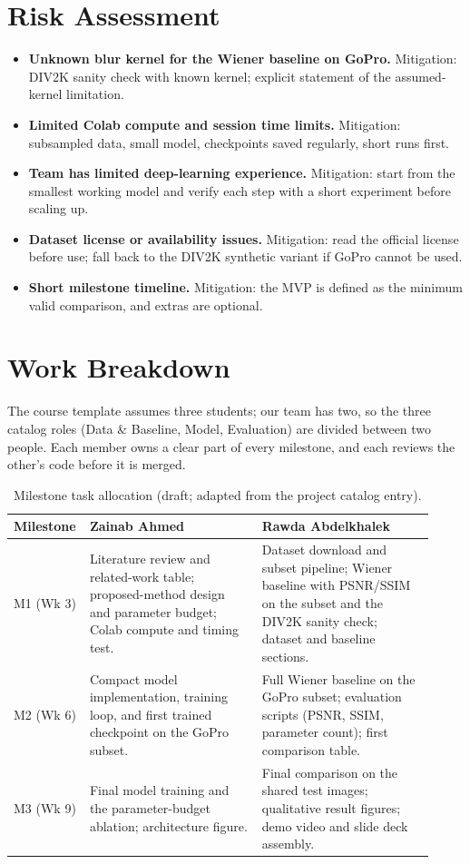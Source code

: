 \documentclass[11pt]{article}
\begin{document}
\section{Risk Assessment}
\label{sec:risk}
\begin{itemize}[leftmargin=*]
  \item \textbf{Unknown blur kernel for the Wiener baseline on GoPro.} Mitigation: DIV2K
        sanity check with known kernel; explicit statement of the assumed-kernel limitation.
  \item \textbf{Limited Colab compute and session time limits.} Mitigation: subsampled data,
        small model, checkpoints saved regularly, short runs first.
  \item \textbf{Team has limited deep-learning experience.} Mitigation: start from the smallest
        working model and verify each step with a short experiment before scaling up.
  \item \textbf{Dataset license or availability issues.} Mitigation: read the official license
        before use; fall back to the DIV2K synthetic variant if GoPro cannot be used.
  \item \textbf{Short milestone timeline.} Mitigation: the MVP is defined as the minimum
        valid comparison, and extras are optional.
\end{itemize}

\section{Work Breakdown}
\label{sec:workbreakdown}
The course template assumes three students; our team has two, so the three catalog roles
(Data \& Baseline, Model, Evaluation) are divided between two people.
Each member owns a clear part of every milestone, and each reviews the other's code before it is merged.

\begin{table}[h]
\centering
\caption{Milestone task allocation (draft; adapted from the project catalog entry).}
\label{tab:tasks}
\begin{tabular}{@{}p{0.12\linewidth}p{0.40\linewidth}p{0.40\linewidth}@{}}
\toprule
\textbf{Milestone} & \textbf{Zainab Ahmed} & \textbf{Rawda Abdelkhalek} \\
\midrule
M1 (Wk 3) & Literature review and related-work table; proposed-method design and parameter budget; Colab compute and timing test. & Dataset download and subset pipeline; Wiener baseline with PSNR/SSIM on the subset and the DIV2K sanity check; dataset and baseline sections. \\
M2 (Wk 6) & Compact model implementation, training loop, and first trained checkpoint on the GoPro subset. & Full Wiener baseline on the GoPro subset; evaluation scripts (PSNR, SSIM, parameter count); first comparison table. \\
M3 (Wk 9) & Final model training and the parameter-budget ablation; architecture figure. & Final comparison on the shared test images; qualitative result figures; demo video and slide deck assembly. \\
\bottomrule
\end{tabular}
\end{table}
\end{document}
